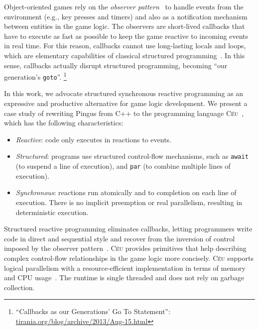 \documentclass{vgtc}                          %
\newcommand{\CEU}{\textsc{C\'{e}u}\xspace}
\newcommand{\code}[1] {{\small{\texttt{#1}}}}
\begin{document}

Object-oriented games rely on the \emph{observer pattern}~\cite{games.patterns}
to handle events from the environment (e.g., key presses and timers) and also
as a notification mechanism between entities in the game logic.
%
The observers are short-lived callbacks that have to execute as fast as
possible to keep the game reactive to incoming events in real time.
%
For this reason, callbacks cannot use long-lasting locals and loops, which are
elementary capabilities of classical structured
programming~\cite{rp.deprecating,rp.rescala,sync_async.cooperative}.
%
In this sense, callbacks actually disrupt structured programming, becoming
``our generation's \code{goto}''.%
\footnote{``Callbacks as our Generations' Go To Statement'':
\url{tirania.org/blog/archive/2013/Aug-15.html}}

In this work, we advocate structured synchronous reactive programming as an
expressive and productive alternative for game logic development.
We present a case study of rewriting Pingus from C++ to the programming
language \CEU~\cite{ceu.sensys13,ceu.mod15}, which has the following
characteristics:
%
\begin{itemize}
\item \emph{Reactive}: code only executes in reactions to events.
\item \emph{Structured}: programs use structured control-flow mechanisms, such
      as \code{await} (to suspend a line of execution), and \code{par} (to
      combine multiple lines of execution).
\item \emph{Synchronous}: reactions run atomically and to completion on each
      line of execution.
      There is no implicit preemption or real parallelism, resulting in
      deterministic execution.
\end{itemize}
%
Structured reactive programming eliminates callbacks, letting programmers write
code in direct and sequential style and recover from the inversion of control
imposed by the observer pattern~\cite{rp.deprecating}.
%
\CEU provides primitives that help describing complex control-flow
relationships in the game logic more concisely.
%
\CEU supports logical parallelism with a resource-efficient implementation in
terms of memory and CPU usage~\cite{ceu.sensys13}.
The runtime is single threaded and does not rely on garbage collection.
\end{document}
